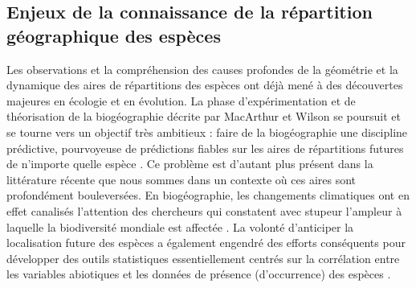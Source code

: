 \subsection*{Enjeux de la connaissance de la répartition géographique
des
espèces}\label{enjeux-de-la-connaissance-de-la-ruxe9partition-guxe9ographique-des-espuxe8ces}

Les observations et la compréhension des causes profondes de la
géométrie et la dynamique des aires de répartitions des espèces ont déjà
mené à des découvertes majeures en écologie et en évolution. La phase
d'expérimentation et de théorisation de la biogéographie décrite par
MacArthur et Wilson se poursuit et se tourne vers un objectif très
ambitieux : faire de la biogéographie une discipline prédictive,
pourvoyeuse de prédictions fiables sur les aires de répartitions futures
de n'importe quelle espèce \citep{Mouquet2015, Warren2015}. Ce problème
est d'autant plus présent dans la littérature récente que nous sommes
dans un contexte où ces aires sont profondément bouleversées. En
biogéographie, les changements climatiques ont en effet canalisés
l'attention des chercheurs qui constatent avec stupeur l'ampleur à
laquelle la biodiversité mondiale est affectée
\citep{Koh2004, Bellard2012}. La volonté d'anticiper la localisation
future des espèces a également engendré des efforts conséquents pour
développer des outils statistiques essentiellement centrés sur la
corrélation entre les variables abiotiques et les données de présence
(d'occurrence) des espèces \citep{Elith2006}.


